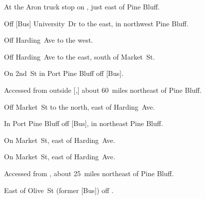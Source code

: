 
\begin{LocationList}

At the Aron truck stop on  , just east of Pine Bluff.

Off [Bus] University~Dr to the east, in northwest Pine Bluff.

Off Harding~Ave to the west.

Off Harding~Ave to the east, south of Market~St.

\Location{\GarageHQ \Garage}
On 2nd~St in Port Pine Bluff off [Bus].

Accessed from   outside [,] about 60~miles northeast of Pine Bluff.

Off Market~St to the north, east of Harding~Ave.

In Port Pine Bluff off [Bus], in northeast Pine Bluff.

On Market~St, east of Harding~Ave.

\Location{\RecruitmentAgency \Recruitment}
On Market~St, east of Harding~Ave.

Accessed from  , about 25~miles northeast of Pine Bluff.

East of  Olive~St (former [Bus]) off .

\end{LocationList}
